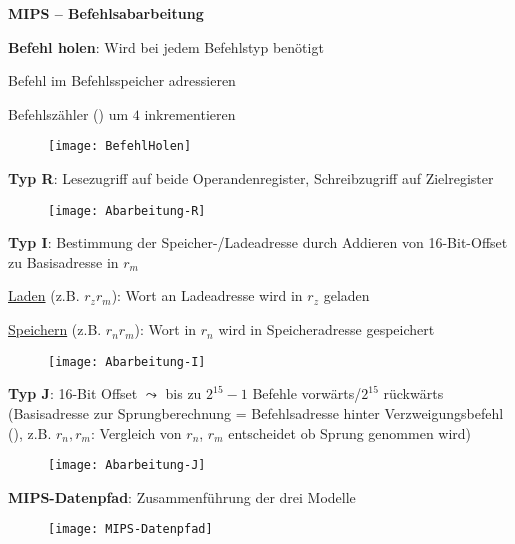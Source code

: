 \textbf{MIPS  -- Befehlsabarbeitung}
\begin{items}
  \item \textbf{Befehl holen}: Wird bei jedem Befehlstyp benötigt
  \begin{enumeration}
    \item Befehl im Befehlsspeicher adressieren
    \item Befehlszähler () um \( 4 \) inkrementieren
  \end{enumeration}
  \begin{figure}[H]\centering\label{BefehlHolen}\texttt{[image: BefehlHolen]}\end{figure}

  \item \textbf{Typ R}: Lesezugriff auf beide Operandenregister, Schreibzugriff auf Zielregister
  \begin{figure}[H]\centering\label{Abarbeitung-R}\texttt{[image: Abarbeitung-R]}\end{figure}

  \item \textbf{Typ I}: Bestimmung der Speicher-/Ladeadresse durch Addieren von 16-Bit-Offset zu Basisadresse in \( r_m \)
  \begin{enumeration}
    \item \underline{Laden} (z.B.  \( r_z \)\( r_m \)\code{)}): Wort an Ladeadresse wird in \( r_z \) geladen
    \item \underline{Speichern} (z.B.  \( r_n \)\( r_m \)\code{)}): Wort in \( r_n \) wird in Speicheradresse gespeichert
  \end{enumeration}
  \begin{figure}[H]\centering\label{Abarbeitung-I}\texttt{[image: Abarbeitung-I]}\end{figure}

  \item \textbf{Typ J}: 16-Bit Offset \( \leadsto \) bis zu \( 2^{15}-1 \) Befehle vorwärts/\( 2^{15} \) rückwärts (Basisadresse zur Sprungberechnung = Befehlsadresse hinter Verzweigungsbefehl (), z.B.  \( r_n, r_m \): Vergleich von \( r_n \), \( r_m \) entscheidet ob Sprung genommen wird)
  \begin{figure}[H]\centering\label{Abarbeitung-J}\texttt{[image: Abarbeitung-J]}\end{figure}

  \newpage

  \item \textbf{MIPS-Datenpfad}: Zusammenführung der drei Modelle
  \begin{figure}[H]\centering\label{MIPS-Datenpfad}\texttt{[image: MIPS-Datenpfad]}\end{figure}
\end{items}

